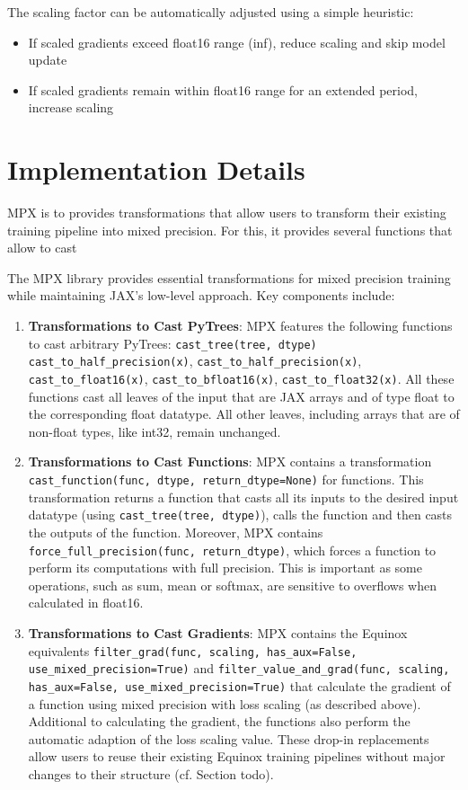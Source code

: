 \documentclass[11pt,a4paper]{article}
\newcommand{\mpx}{\textsc{MPX}}
\begin{document}
The scaling factor can be automatically adjusted using a simple heuristic:
\begin{itemize}
    \item If scaled gradients exceed float16 range (inf), reduce scaling and skip model update
    \item If scaled gradients remain within float16 range for an extended period, increase scaling
\end{itemize}

\section{Implementation Details}
\mpx{} is to provides transformations that allow users to transform their existing training pipeline into mixed precision.
For this, it provides several functions that allow to cast

The \mpx{} library provides essential transformations for mixed precision training while maintaining JAX's low-level approach. Key components include:

\begin{enumerate}
    \item \textbf{Transformations to Cast PyTrees}: \mpx{} features the following functions to cast arbitrary PyTrees: \texttt{cast\_tree(tree, dtype)} \texttt{cast\_to\_half\_precision(x)}, \texttt{cast\_to\_half\_precision(x)}, \texttt{cast\_to\_float16(x)}, \texttt{cast\_to\_bfloat16(x)}, \texttt{cast\_to\_float32(x)}. All these functions cast all leaves of the input that are JAX arrays and of type float to the corresponding float datatype. All other leaves, including arrays that are of non-float types, like int32, remain unchanged. 
    \item \textbf{Transformations to Cast Functions}: \mpx{} contains a transformation \texttt{cast\_function(func, dtype, return\_dtype=None)} for functions. This transformation returns a function that casts all its inputs to the desired input datatype (using \texttt{cast\_tree(tree, dtype)}), calls the function and then casts the outputs of the function. Moreover, \mpx{} contains \texttt{force\_full\_precision(func, return\_dtype)}, which forces a function to perform its computations with full precision. This is important as some operations, such as sum, mean or softmax, are sensitive to overflows when calculated in float16.
    \item \textbf{Transformations to Cast Gradients}: \mpx{} contains the Equinox equivalents \texttt{filter\_grad(func, scaling, has\_aux=False, use\_mixed\_precision=True)} and \texttt{filter\_value\_and\_grad(func, scaling, has\_aux=False, use\_mixed\_precision=True)} that calculate the gradient of a function using mixed precision with loss scaling (as described above). Additional to calculating the gradient, the functions also perform the automatic adaption of the loss scaling value.
    These drop-in replacements allow users to reuse their existing Equinox training pipelines without major changes to their structure (cf. Section todo).
\end{enumerate}
\end{document}
